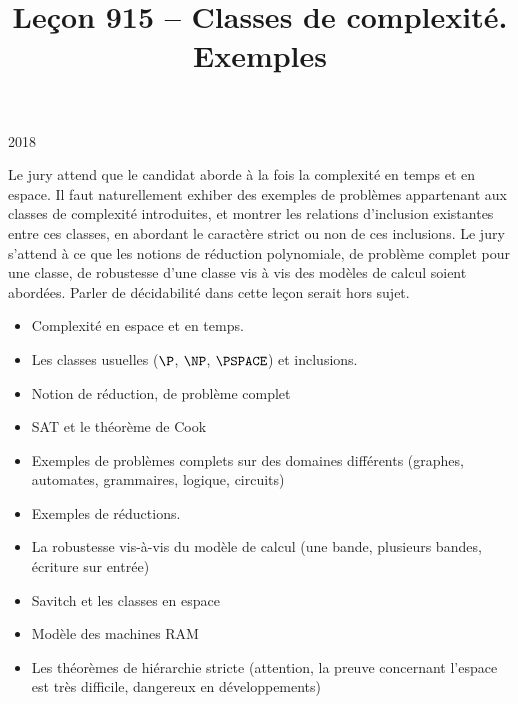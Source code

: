 \documentclass{agregfiche}
\title{Leçon 915 -- Classes de complexité. Exemples}
\begin{document}
\maketitle

\secrapports

\begin{rapport}{2018}

Le jury attend que le candidat aborde à la fois la complexité en temps et en
espace. Il faut naturellement exhiber des exemples de problèmes appartenant aux
classes de complexité introduites, et montrer les relations d’inclusion
existantes entre ces classes, en abordant le caractère strict ou non de ces
inclusions. Le jury s’attend à ce que les notions de réduction polynomiale, de
problème complet pour une classe, de robustesse d’une classe vis à vis des
modèles de calcul soient abordées. Parler de décidabilité dans cette leçon
serait hors sujet.

\end{rapport}

\secindispensables

\begin{itemize}
    \item Complexité en espace et en temps.
    \item Les classes usuelles ($\P$, $\NP$, $\PSPACE$) et inclusions.
    \item Notion de réduction, de problème complet
    \item SAT et le théorème de Cook
    

\end{itemize}

\secasavoir

\begin{itemize}
	\item Exemples de problèmes complets sur des 
domaines différents (graphes, automates,
grammaires, logique, circuits)
    \item Exemples de réductions.
	\item La robustesse vis-à-vis du modèle de calcul (une bande, plusieurs 
	bandes, écriture sur entrée)
	\item Savitch et les classes en espace
    \item Modèle des machines RAM
    \item Les théorèmes de hiérarchie stricte (attention, la preuve concernant l'espace est très difficile, dangereux en développements)
\end{itemize}
\end{document}
